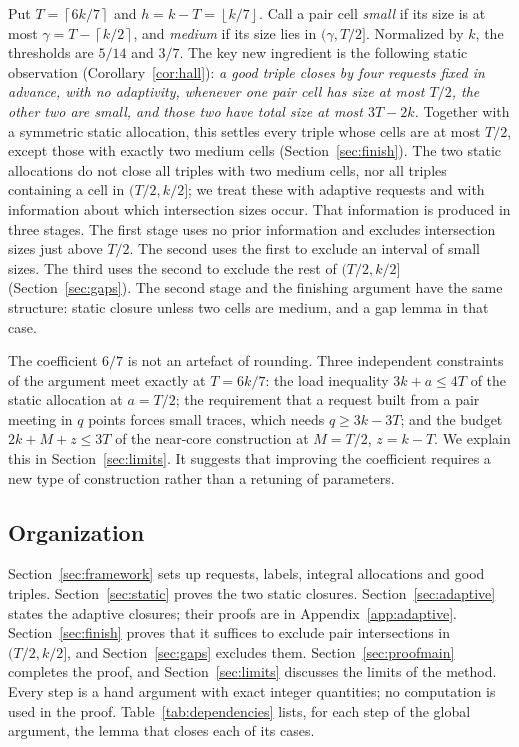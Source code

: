 \documentclass[11pt]{article}
\numberwithin{equation}{section}
\theoremstyle{definition}
\theoremstyle{remark}
\newcommand{\ceil}[1]{\left\lceil #1\right\rceil}
\newcommand{\floor}[1]{\left\lfloor #1\right\rfloor}
\begin{document}
Put $T=\ceil{6k/7}$ and $h=k-T=\floor{k/7}$. Call a pair cell
\emph{small} if its size is at most $\gamma=T-\ceil{k/2}$, and
\emph{medium} if its size lies in $(\gamma,T/2]$. Normalized by $k$, the
thresholds are $5/14$ and $3/7$. The key new ingredient is the
following static observation (Corollary~\ref{cor:hall}): \emph{a good
triple closes by four requests fixed in advance, with no adaptivity,
whenever one pair cell has size at most $T/2$, the other two are small,
and those two have total size at most $3T-2k$.} Together with a
symmetric static allocation, this settles every triple whose cells are
at most $T/2$, except those with exactly two medium cells
(Section~\ref{sec:finish}). The two static allocations do not close all
triples with two medium cells, nor all triples containing a cell in
$(T/2,k/2]$; we treat these with adaptive requests and with information
about which intersection sizes occur. That information is produced in
three stages. The first stage uses no prior
information and excludes intersection sizes just above $T/2$. The
second uses the first to exclude an interval of small sizes. The third
uses the second to exclude the rest of $(T/2,k/2]$
(Section~\ref{sec:gaps}). The second stage and the finishing argument
have the same structure: static closure unless two cells are medium,
and a gap lemma in that case.

The coefficient $6/7$ is not an artefact of rounding. Three independent
constraints of the argument meet exactly at $T=6k/7$: the load
inequality $3k+a\le4T$ of the static allocation at $a=T/2$; the
requirement that a request built from a pair meeting in $q$ points
forces small traces, which needs $q\ge3k-3T$; and the budget
$2k+M+z\le3T$ of the near-core construction at $M=T/2$, $z=k-T$. We
explain this in Section~\ref{sec:limits}. It suggests that improving
the coefficient requires a new type of construction rather than a
retuning of parameters.

\subsection*{Organization}
Section~\ref{sec:framework} sets up requests, labels, integral
allocations and good triples. Section~\ref{sec:static} proves the two
static closures. Section~\ref{sec:adaptive} states the adaptive
closures; their proofs are in Appendix~\ref{app:adaptive}.
Section~\ref{sec:finish} proves that it suffices to exclude pair
intersections in $(T/2,k/2]$, and Section~\ref{sec:gaps} excludes them.
Section~\ref{sec:proofmain} completes the proof, and
Section~\ref{sec:limits} discusses the limits of the method. Every step is a hand argument with exact integer quantities;
no computation is used in the proof.
Table~\ref{tab:dependencies} lists, for each step of the global
argument, the lemma that closes each of its cases.
\end{document}
